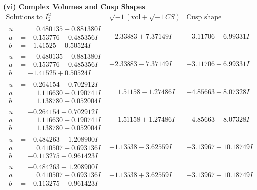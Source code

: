 \documentclass[1p]{elsarticle_modified}
\theoremstyle{definition}
\newcommand{\I}{\sqrt{-1}}
\begin{document}
\newpage\flushleft \textbf{(vi) Complex Volumes and Cusp Shapes}
$$\begin{array}{c|c|c}  
\text{Solutions to }I^u_{2}& \I (\text{vol} + \sqrt{-1}CS) & \text{Cusp shape}\\
 \hline 
\begin{aligned}
u &= \phantom{-}0.480135 + 0.881380 I \\
a &= -0.153776 - 0.485356 I \\
b &= -1.41525 - 0.50524 I\end{aligned}
 & -2.33883 + 7.37149 I & -3.11706 - 6.99331 I \\ \hline\begin{aligned}
u &= \phantom{-}0.480135 - 0.881380 I \\
a &= -0.153776 + 0.485356 I \\
b &= -1.41525 + 0.50524 I\end{aligned}
 & -2.33883 - 7.37149 I & -3.11706 + 6.99331 I \\ \hline\begin{aligned}
u &= -0.264154 + 0.702912 I \\
a &= \phantom{-}1.116630 + 0.190741 I \\
b &= \phantom{-}1.138780 - 0.052004 I\end{aligned}
 & \phantom{-}1.51158 - 1.27486 I & -4.85663 + 8.07328 I \\ \hline\begin{aligned}
u &= -0.264154 - 0.702912 I \\
a &= \phantom{-}1.116630 - 0.190741 I \\
b &= \phantom{-}1.138780 + 0.052004 I\end{aligned}
 & \phantom{-}1.51158 + 1.27486 I & -4.85663 - 8.07328 I \\ \hline\begin{aligned}
u &= -0.484263 + 1.208900 I \\
a &= \phantom{-}0.410507 - 0.693136 I \\
b &= -0.113275 - 0.961423 I\end{aligned}
 & -1.13538 - 3.62559 I & -3.13967 + 10.18749 I \\ \hline\begin{aligned}
u &= -0.484263 - 1.208900 I \\
a &= \phantom{-}0.410507 + 0.693136 I \\
b &= -0.113275 + 0.961423 I\end{aligned}
 & -1.13538 + 3.62559 I & -3.13967 - 10.18749 I \\ \hline\begin{aligned}

\end{aligned}
\end{array}$$
\end{document}
